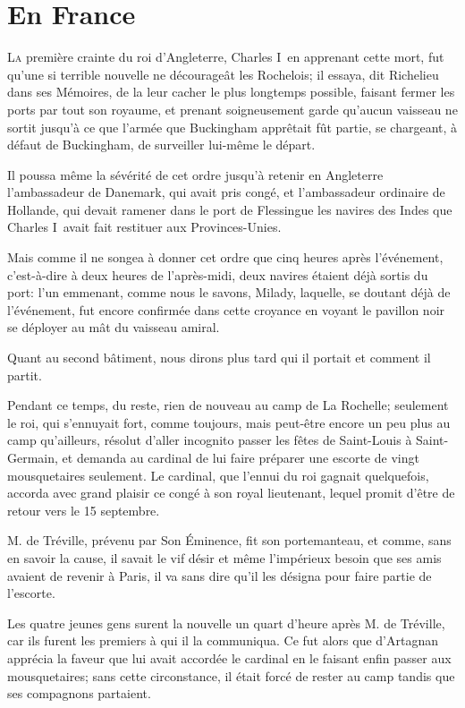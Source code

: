 
\chapter{En France}

\lettrine{L}{a} première crainte du roi d'Angleterre, Charles I\ier\, en apprenant cette mort, fut qu'une si terrible nouvelle ne décourageât les Rochelois; il essaya, dit Richelieu dans ses Mémoires, de la leur cacher le plus longtemps possible, faisant fermer les ports par tout son royaume, et prenant soigneusement garde qu'aucun vaisseau ne sortit jusqu'à ce que l'armée que Buckingham apprêtait fût partie, se chargeant, à défaut de Buckingham, de surveiller lui-même le départ. 

Il poussa même la sévérité de cet ordre jusqu'à retenir en Angleterre l'ambassadeur de Danemark, qui avait pris congé, et l'ambassadeur ordinaire de Hollande, qui devait ramener dans le port de Flessingue les navires des Indes que Charles I\ier\ avait fait restituer aux Provinces-Unies. 

Mais comme il ne songea à donner cet ordre que cinq heures après l'événement, c'est-à-dire à deux heures de l'après-midi, deux navires étaient déjà sortis du port: l'un emmenant, comme nous le savons, Milady, laquelle, se doutant déjà de l'événement, fut encore confirmée dans cette croyance en voyant le pavillon noir se déployer au mât du vaisseau amiral. 

Quant au second bâtiment, nous dirons plus tard qui il portait et comment il partit. 

Pendant ce temps, du reste, rien de nouveau au camp de La Rochelle; seulement le roi, qui s'ennuyait fort, comme toujours, mais peut-être encore un peu plus au camp qu'ailleurs, résolut d'aller incognito passer les fêtes de Saint-Louis à Saint-Germain, et demanda au cardinal de lui faire préparer une escorte de vingt mousquetaires seulement. Le cardinal, que l'ennui du roi gagnait quelquefois, accorda avec grand plaisir ce congé à son royal lieutenant, lequel promit d'être de retour vers le 15 septembre. 

M. de Tréville, prévenu par Son Éminence, fit son portemanteau, et comme, sans en savoir la cause, il savait le vif désir et même l'impérieux besoin que ses amis avaient de revenir à Paris, il va sans dire qu'il les désigna pour faire partie de l'escorte. 

Les quatre jeunes gens surent la nouvelle un quart d'heure après M. de Tréville, car ils furent les premiers à qui il la communiqua. Ce fut alors que d'Artagnan apprécia la faveur que lui avait accordée le cardinal en le faisant enfin passer aux mousquetaires; sans cette circonstance, il était forcé de rester au camp tandis que ses compagnons partaient. 

